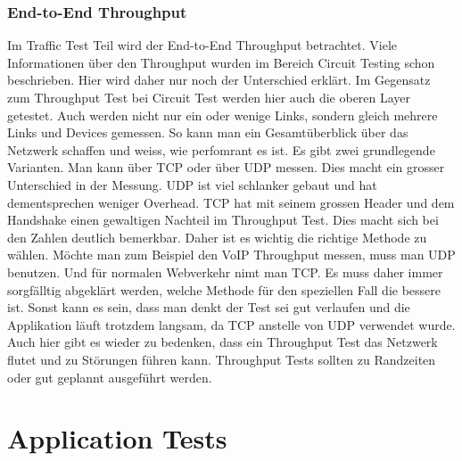 \documentclass[a4,12pt]{scrartcl}
\begin{document}
\subsubsection{End-to-End Throughput}
Im Traffic Test Teil wird der End-to-End Throughput betrachtet. Viele Informationen über den Throughput wurden im Bereich Circuit Testing schon beschrieben. Hier wird daher nur noch der Unterschied erklärt.\newline\newline
Im Gegensatz zum Throughput Test bei Circuit Test werden hier auch die oberen Layer getestet. Auch werden nicht nur ein oder wenige Links, sondern gleich mehrere Links und Devices gemessen.
So kann man ein Gesamtüberblick über das Netzwerk schaffen und weiss, wie perfomrant es ist.\newline\newline
Es gibt zwei grundlegende Varianten. Man kann über TCP oder über UDP messen. Dies macht ein grosser Unterschied in der Messung. 
UDP ist viel schlanker gebaut und hat dementsprechen weniger Overhead. TCP hat mit seinem grossen Header und dem Handshake einen gewaltigen Nachteil im Throughput Test. Dies macht sich bei den Zahlen deutlich bemerkbar.\newline\newline
Daher ist es wichtig die richtige Methode zu wählen.
Möchte man zum Beispiel den VoIP Throughput messen, muss man UDP benutzen. Und für normalen Webverkehr nimt man TCP. Es muss daher immer sorgfälltig abgeklärt werden, welche Methode für den speziellen Fall die bessere ist. Sonst kann es sein, dass man denkt der Test sei gut verlaufen und die Applikation läuft trotzdem langsam, da TCP anstelle von UDP verwendet wurde.\newline\newline
Auch hier gibt es wieder zu bedenken, dass ein Throughput Test das Netzwerk flutet und zu Störungen führen kann. Throughput Tests sollten zu Randzeiten oder gut geplannt ausgeführt werden. 

\section{Application Tests}
\end{document}
